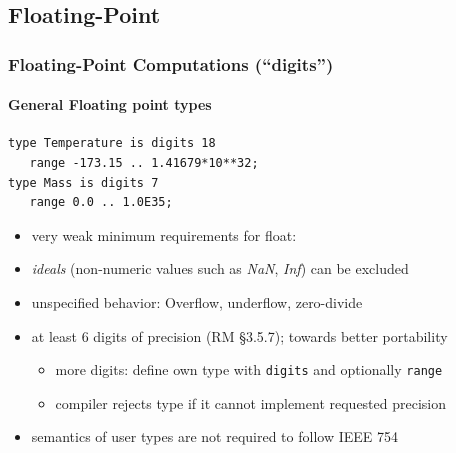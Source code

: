 \subsection{Floating-Point}
\begin{frame}[fragile]
  \frametitle{Floating-Point Computations (``digits'')}
   \framesubtitle{General Floating point types}
\begin{lstlisting}
type Temperature is digits 18 
   range -173.15 .. 1.41679*10**32;
type Mass is digits 7 
   range 0.0 .. 1.0E35;
\end{lstlisting}
  \begin{itemize}
  \item very weak minimum requirements for float: 
  \item \emph{ideals} (non-numeric values such as \emph{NaN},
    \emph{Inf}) can be excluded
  \item unspecified behavior: Overflow, underflow, zero-divide
  \item at least 6 digits of precision (RM \S3.5.7); towards better portability
    \begin{itemize}
    \item more digits: define own type with \texttt{digits} and optionally \texttt{range}
    \item compiler rejects type if it cannot implement requested precision
    \end{itemize}
  \item semantics of user types are not required to follow IEEE 754
  \end{itemize}
\end{frame}

